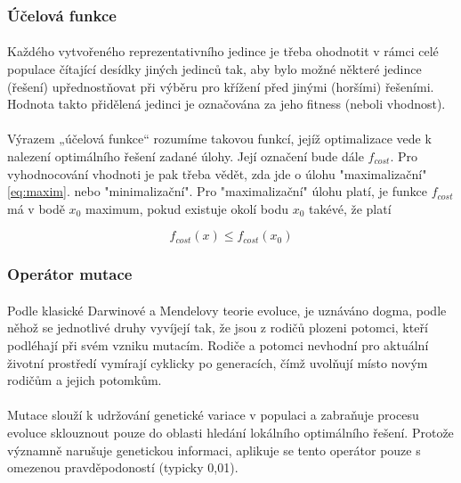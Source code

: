 \documentclass[bc,male,java,dept460]{diploma}		%
\begin{document}
\subsubsection{Účelová funkce}
\paragraph*{}
Každého vytvořeného reprezentativního jedince je třeba ohodnotit v rámci celé populace čítající desídky jiných jedinců tak, aby bylo možné některé jedince (řešení) upřednostňovat při výběru pro křížení před jinými (horšími) řešeními.
Hodnota takto přidělená jedinci je označována za jeho fitness (neboli vhodnost).

\paragraph*{}
Výrazem „účelová funkce“ rozumíme takovou funkcí, jejíž optimalizace vede k nalezení
optimálního řešení zadané úlohy. Její označení bude dále $f_{cost}$. Pro vyhodnocování vhodnoti je pak třeba vědět, zda jde o úlohu "maximalizační" \ref{eq:maxim}. nebo "minimalizační". Pro "maximalizační" úlohu platí, je funkce $f_{cost}$ má v bodě $x_0$ maximum, pokud existuje okolí bodu $x_0$ takévé, že platí

\begin{equation}
f_{cost}(x) \leq f_{cost}(x_0)
\label{eq:maxim}
\end{equation}

\subsubsection{Operátor mutace}
\paragraph*{}
Podle klasické Darwinové a Mendelovy teorie evoluce, je uznáváno dogma, podle něhož se jednotlivé druhy vyvíjejí tak, že jsou z rodičů plozeni potomci, kteří podléhají při svém vzniku mutacím. Rodiče a potomci nevhodní pro aktuální životní prostředí vymírají cyklicky po generacích, čímž uvolňují místo novým rodičům a jejich potomkům.


\paragraph*{}
Mutace slouží k udržování genetické variace v populaci a zabraňuje procesu evoluce sklouznout pouze do oblasti hledání lokálního optimálního řešení. Protože významně narušuje genetickou informaci, aplikuje se tento operátor pouze s omezenou pravděpodoností (typicky 0,01).
\end{document}
